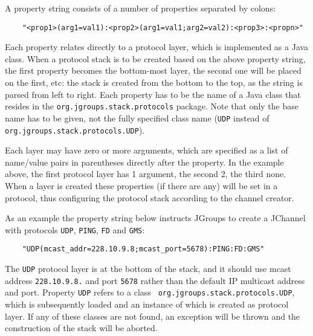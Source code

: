     A property string consists of a number of properties separated by colons:

    \begin{small}
    \begin{verbatim}
    "<prop1>(arg1=val1):<prop2>(arg1=val1;arg2=val2):<prop3>:<propn>"
    \end{verbatim}
    \end{small}

    Each property relates directly to a protocol layer, which is implemented as a
    Java class. When a protocol stack is to be created based on the above property
    string, the first property becomes the bottom-most layer, the second one will be
    placed on the first, etc: the stack is created from the bottom to the top, as the
    string is parsed from left to right. Each property has to be the name of a Java
    class that resides in the {\tt org.jgroups.stack.protocols} package. Note that
    only the base name has to be given, not the fully specified class name ({\tt UDP}
    instead of {\tt org.jgroups.stack.protocols.UDP}).

    Each layer may have zero or more arguments, which are specified as a list of
    name/value pairs in parentheses directly after the property. In the example
    above, the first protocol layer has 1 argument, the second 2, the third
    none. When a layer is created these properties (if there are any) will be set in
    a protocol, thus configuring the protocol stack according to the channel creator.

    As an example the property string below instructs JGroups to create a
    JChannel with protocols {\tt UDP}, {\tt PING}, {\tt FD} and {\tt GMS}:


    \begin{small}
    \begin{verbatim}
    "UDP(mcast_addr=228.10.9.8;mcast_port=5678):PING:FD:GMS"
    \end{verbatim}
    \end{small}

    The {\tt UDP} protocol layer is at the bottom of the stack, and it should use
    mcast address {\tt 228.10.9.8.} and port {\tt 5678} rather than the default IP
    multicast address and port. Property {\tt UDP} refers to a class {\tt
    org.jgroups.stack.protocols.UDP}, which is subsequently loaded and an instance
    of which is created as protocol layer. If any of these classes are not found, an
    exception will be thrown and the construction of the stack will be aborted.

